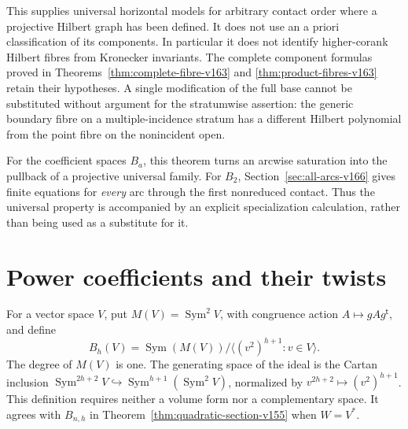 \documentclass[11pt,reqno]{amsart}
\numberwithin{equation}{section}
\theoremstyle{definition}\newtheorem{definition}[theorem]{Definition}
\theoremstyle{remark}\newtheorem{remark}[theorem]{Remark}
\DeclareMathOperator{\Sym}{Sym}\DeclareMathOperator{\Gr}{Gr}
\begin{document}
This supplies universal horizontal models for arbitrary contact order
where a projective Hilbert graph has been defined. It does not use
an a priori classification of its components. In particular it does
not identify higher-corank Hilbert fibres from Kronecker invariants.
The complete component formulas proved in
Theorems~\ref{thm:complete-fibre-v163} and
\ref{thm:product-fibres-v163} retain their hypotheses. A single
modification of the full base cannot be substituted without argument
for the stratumwise assertion: the generic boundary fibre on a
multiple-incidence stratum has a different Hilbert polynomial from
the point fibre on the nonincident open.

For the coefficient spaces $B_a$, this theorem turns an arcwise
saturation into the pullback of a projective universal family. For
$B_2$, Section~\ref{sec:all-arcs-v166} gives finite equations for \emph{every} arc
through the first nonreduced contact. Thus the universal property is
accompanied by an explicit specialization calculation, rather than
being used as a substitute for it.

\section{Power coefficients and their twists}
\label{sec:power-conventions-v158}
For a vector space $V$, put $M(V)=\Sym^2V$, with congruence action
$A\mapsto gAg^{\mathsf t}$, and define
\begin{equation}\label{eq:envelope-presentation-v158}
 B_h(V)=\Sym(M(V))/\langle (v^2)^{h+1}:v\in V\rangle .
\end{equation}
The degree of $M(V)$ is one. The generating space of the ideal is the
Cartan inclusion $\Sym^{2h+2}V\hookrightarrow\Sym^{h+1}(\Sym^2V)$,
normalized by $v^{2h+2}\mapsto(v^2)^{h+1}$. This definition requires
neither a volume form nor a complementary space. It agrees with
$B_{n,h}$ in Theorem~\ref{thm:quadratic-section-v155} when $W=V^*$.
\end{document}
